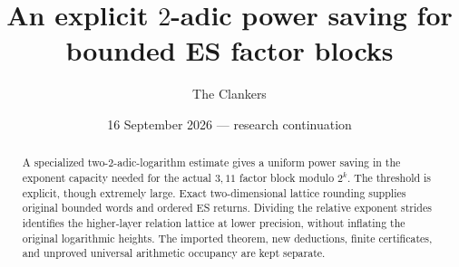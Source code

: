 \documentclass[10pt,a4paper]{article}
\title{An explicit $2$-adic power saving for bounded ES factor blocks}
\author{The Clankers}
\date{16 September 2026 --- research continuation}
\begin{document}
\maketitle
\begin{abstract}
A specialized two-$2$-adic-logarithm estimate gives a uniform power saving in
the exponent capacity needed for the actual $3,11$ factor block modulo $2^k$.
The threshold is explicit, though extremely large. Exact two-dimensional
lattice rounding supplies original bounded words and ordered ES returns.
Dividing the relative exponent strides identifies the higher-layer relation
lattice at lower precision, without inflating the original logarithmic heights.
The imported theorem, new deductions, finite certificates, and unproved
universal arithmetic occupancy are kept separate.
\end{abstract}


\end{document}
